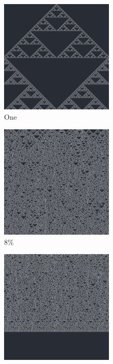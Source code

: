 \documentclass[12pt, fleqn]{report}                             %
\theoremstyle{break}                                            %
\begin{document}
      \begin{figure}[ht!]
        \centering
        \begin{subfigure}[b]{0.4\linewidth}
          \includegraphics[width=0.6\textwidth]{Images/146/a.png}
          \caption{One}
        \end{subfigure}
        \begin{subfigure}[b]{0.4\linewidth}
          \includegraphics[width=0.6\textwidth]{Images/146/b.png}
          \caption{8\%}
        \end{subfigure}
        \begin{subfigure}[b]{0.4\linewidth}
          \includegraphics[width=0.6\textwidth]{Images/146/c.png}

\end{subfigure}
\end{figure}
\end{document}
